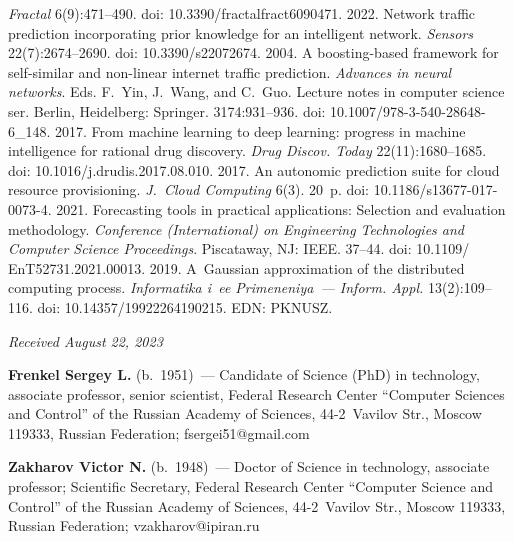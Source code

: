 \begin{multicols}{2}
{{\begin{thebibliography}{99}
\textit{Fractal} 6(9):471--490. doi: 10.3390/fractalfract6090471.
 2022. Network traffic 
prediction incorporating prior knowledge for an intelligent network. 
\textit{Sensors} 22(7):2674--2690. doi: 10.3390/s22072674.
 2004. A boosting-based framework for  
self-similar and non-linear internet traffic prediction. \textit{Advances in neural 
networks}. Eds. F.~Yin, J.~Wang, and C.~Guo. Lecture notes in computer science 
ser. Berlin, Heidelberg: Springer. 3174:931--936. doi:  
10.1007/978-3-540-28648-6\_148.
 2017. From machine learning to deep 
learning: progress in machine intelligence for rational drug discovery. \textit{Drug 
Discov. Today} 22(11):1680--1685. doi: 10.1016/j.drudis.2017.08.010.
 2017. An autonomic 
prediction suite for cloud resource provisioning. \textit{J.~Cloud Computing}  
6(3). 20~p. doi: 10.1186/s13677-017-0073-4.
 2021. Forecasting tools in practical 
applications: Selection and evaluation methodology. \textit{Conference 
(International) on Engineering Technologies and Computer Science Proceedings}. 
Piscataway, NJ: IEEE. 37--44. doi: 10.1109/ EnT52731.2021.00013. 
 2019. A~Gaussian 
approximation of the distributed computing process. \textit{Informatika i~ee 
Primeneniya~--- Inform. \mbox{Appl}.} 13(2):109--116. doi: 10.14357/19922264190215. 
EDN: PKNUSZ.

\end{thebibliography}

 }
 }

\end{multicols}

\vspace*{-8pt}

\hfill{\small\textit{Received August 22, 2023}} 

\vspace*{-14pt}


\Contr

\vspace*{-4pt}

\noindent
\textbf{Frenkel Sergey L.} (b.\ 1951)~--- Candidate of Science (PhD) in 
technology, associate professor, senior scientist, Federal Research Center 
``Computer Sciences and Control'' of the Russian Academy of Sciences,  
44-2~Vavilov Str., Moscow 119333, Russian Federation; 
\mbox{fsergei51@gmail.com}

\vspace*{3pt}

\noindent
\textbf{Zakharov Victor N.} (b.\ 1948)~--- Doctor of Science in technology, 
associate professor; Scientific Secretary, Federal Research Center ``Computer 
Science and Control'' of the Russian Academy of Sciences, 44-2~Vavilov Str., 
Moscow 119333, Russian Federation; \mbox{vzakharov@ipiran.ru}



\label{end\stat}

\renewcommand{\bibname}{\protect\rm Литература} 